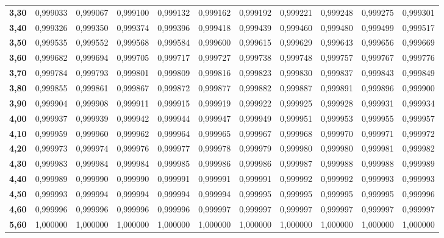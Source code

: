 \begin{tabular}{|r|rrrrr|rrrrr|}
{\bf 3,30} &   0,999033 &   0,999067 &   0,999100 &   0,999132 &   0,999162 &   0,999192 &   0,999221 &   0,999248 &   0,999275 &   0,999301 \\

{\bf 3,40} &   0,999326 &   0,999350 &   0,999374 &   0,999396 &   0,999418 &   0,999439 &   0,999460 &   0,999480 &   0,999499 &   0,999517 \\
\hline
{\bf 3,50} &   0,999535 &   0,999552 &   0,999568 &   0,999584 &   0,999600 &   0,999615 &   0,999629 &   0,999643 &   0,999656 &   0,999669 \\

{\bf 3,60} &   0,999682 &   0,999694 &   0,999705 &   0,999717 &   0,999727 &   0,999738 &   0,999748 &   0,999757 &   0,999767 &   0,999776 \\

{\bf 3,70} &   0,999784 &   0,999793 &   0,999801 &   0,999809 &   0,999816 &   0,999823 &   0,999830 &   0,999837 &   0,999843 &   0,999849 \\

{\bf 3,80} &   0,999855 &   0,999861 &   0,999867 &   0,999872 &   0,999877 &   0,999882 &   0,999887 &   0,999891 &   0,999896 &   0,999900 \\

{\bf 3,90} &   0,999904 &   0,999908 &   0,999911 &   0,999915 &   0,999919 &   0,999922 &   0,999925 &   0,999928 &   0,999931 &   0,999934 \\
\hline \hline
{\bf 4,00} &   0,999937 &   0,999939 &   0,999942 &   0,999944 &   0,999947 &   0,999949 &   0,999951 &   0,999953 &   0,999955 &   0,999957 \\

{\bf 4,10} &   0,999959 &   0,999960 &   0,999962 &   0,999964 &   0,999965 &   0,999967 &   0,999968 &   0,999970 &   0,999971 &   0,999972 \\

{\bf 4,20} &   0,999973 &   0,999974 &   0,999976 &   0,999977 &   0,999978 &   0,999979 &   0,999980 &   0,999980 &   0,999981 &   0,999982 \\

{\bf 4,30} &   0,999983 &   0,999984 &   0,999984 &   0,999985 &   0,999986 &   0,999986 &   0,999987 &   0,999988 &   0,999988 &   0,999989 \\

{\bf 4,40} &   0,999989 &   0,999990 &   0,999990 &   0,999991 &   0,999991 &   0,999991 &   0,999992 &   0,999992 &   0,999993 &   0,999993 \\
\hline
{\bf 4,50} &   0,999993 &   0,999994 &   0,999994 &   0,999994 &   0,999994 &   0,999995 &   0,999995 &   0,999995 &   0,999995 &   0,999996 \\

{\bf 4,60} &   0,999996 &   0,999996 &   0,999996 &   0,999996 &   0,999997 &   0,999997 &   0,999997 &   0,999997 &   0,999997 &   0,999997 \\

{\bf 5,60} &   1,000000 &   1,000000 &   1,000000 &   1,000000 &   1,000000 &   1,000000 &   1,000000 &   1,000000 &   1,000000 &   1,000000 \\
\hline
\end{tabular}  

